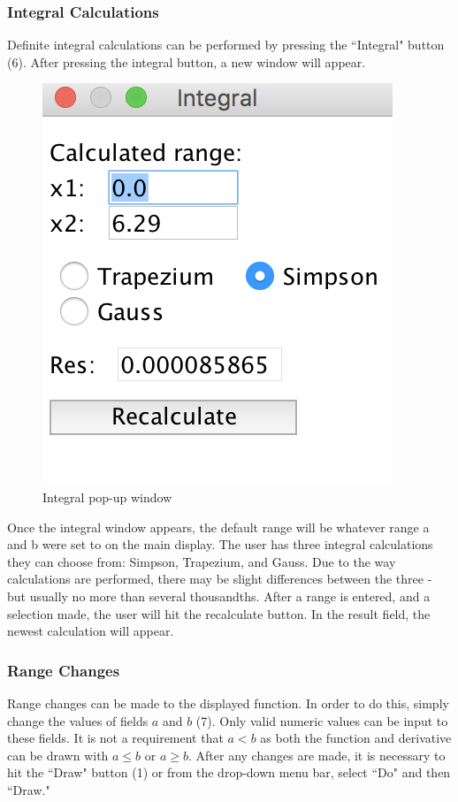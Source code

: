 \documentclass{article}[12 pt]
\begin{document}
			\subsubsection{Integral Calculations}
			Definite integral calculations can be performed by pressing the ``Integral" button (6). After pressing the integral button, a new window will appear.
				\begin{figure}[h!]
					\centering
					\includegraphics[scale=.5]{integral}
					\caption{Integral pop-up window}
				\end{figure}
				Once the integral window appears, the default range will be whatever range a and b were set to on the main display. The user has three integral calculations they can choose from: Simpson, Trapezium, and Gauss. Due to the way calculations are performed, there may be slight differences between the three - but usually no more than several thousandths. After a range is entered, and a selection made, the user will hit the recalculate button. In the result field, the newest calculation will appear.
				
			\subsubsection{Range Changes}
 			Range changes can be made to the displayed function. In order to do this, simply change the values of fields $a$ and $b$ (7). Only valid numeric values can be input to these fields. It is not a requirement that $a < b$ as both the function and derivative can be drawn with $a \leq b$ or $a \geq b$. After any changes are made, it is necessary to hit the ``Draw" button (1) or from the drop-down menu bar, select ``Do" and then ``Draw."
			
\end{document}
